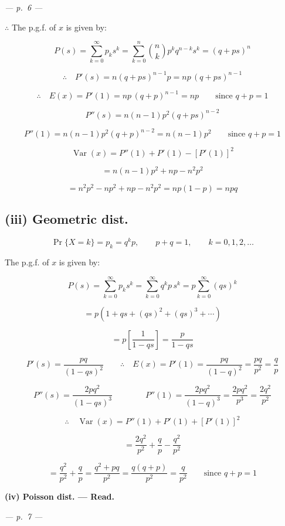 \documentclass[
]{article}
\begin{document}
\emph{--- p.~6 ---}

\(\therefore\) The p.g.f. of \(x\) is given by:

\[P(s) = \sum_{k=0}^{\infty} p_k s^k = \sum_{k=0}^{n} \binom{n}{k} p^k q^{n-k} s^k = (q + ps)^n\]

\[\therefore \quad P'(s) = n(q+ps)^{n-1} p = np\,(q+ps)^{n-1}\]

\[\therefore \quad E(x) = P'(1) = np\,(q+p)^{n-1} = np \qquad \text{since } q + p = 1\]

\[P''(s) = n(n-1) p^2 (q+ps)^{n-2}\]

\[P''(1) = n(n-1) p^2 (q+p)^{n-2} = n(n-1) p^2 \qquad \text{since } q + p = 1\]

\[\operatorname{Var}(x) = P''(1) + P'(1) - \left[P'(1)\right]^2\]

\[= n(n-1)p^2 + np - n^2 p^2\]

\[= n^2 p^2 - np^2 + np - n^2 p^2 = np(1-p) = npq\]

\subsection{(iii) Geometric dist.}\label{iii-geometric-dist.}

\[\Pr\{X = k\} = p_k = q^k p, \qquad p + q = 1, \qquad k = 0, 1, 2, \ldots\]

The p.g.f. of \(x\) is given by:

\[P(s) = \sum_{k=0}^{\infty} p_k s^k = \sum_{k=0}^{\infty} q^k p\, s^k = p \sum_{k=0}^{\infty} (qs)^k\]

\[= p\left(1 + qs + (qs)^2 + (qs)^3 + \cdots\right)\]

\[= p \left[ \frac{1}{1-qs} \right] = \frac{p}{1-qs}\]

\[P'(s) = \frac{pq}{(1-qs)^2} \qquad \therefore \quad E(x) = P'(1) = \frac{pq}{(1-q)^2} = \frac{pq}{p^2} = \frac{q}{p}\]

\[P''(s) = \frac{2pq^2}{(1-qs)^3} \qquad\qquad P''(1) = \frac{2pq^2}{(1-q)^3} = \frac{2pq^2}{p^3} = \frac{2q^2}{p^2}\]

\[\therefore \quad \operatorname{Var}(x) = P''(1) + P'(1) + \left[P'(1)\right]^2\]

\[= \frac{2q^2}{p^2} + \frac{q}{p} - \frac{q^2}{p^2}\]

\[= \frac{q^2}{p^2} + \frac{q}{p} = \frac{q^2 + pq}{p^2} = \frac{q(q+p)}{p^2} = \frac{q}{p^2} \qquad \text{since } q + p = 1\]

\textbf{(iv) Poisson dist. --- Read.}

\emph{--- p.~7 ---}
\end{document}
